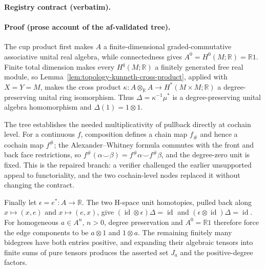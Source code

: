 \noindent\textbf{Registry contract (verbatim).}

\paragraph{Proof (prose account of the af-validated tree).}
The cup product first makes $A$ a finite-dimensional graded-commutative associative
unital real algebra, while connectedness gives $A^0=H^0(M;\mathbb R)=\mathbb R1$.
Finite total dimension makes every $H^q(M;\mathbb R)$ a finitely generated free real
module, so Lemma~\ref{lem:topology-kunneth-cross-product}, applied with $X=Y=M$, makes
the cross product $\kappa:A\otimes_{\mathbb R}A\to H^*(M\times M;\mathbb R)$ a
degree-preserving unital ring isomorphism.  Thus $\Delta=\kappa^{-1}\mu^*$ is a
degree-preserving unital algebra homomorphism and $\Delta(1)=1\otimes1$.

The tree establishes the needed multiplicativity of pullback directly at cochain level.
For a continuous $f$, composition defines a chain map $f_\#$ and hence a cochain map
$f^\#$; the Alexander--Whitney formula commutes with the front and back face restrictions,
so $f^\#(\alpha\smile\beta)=f^\#\alpha\smile f^\#\beta$, and the degree-zero unit is
fixed.  This is the repaired branch: a verifier challenged the earlier unsupported appeal
to functoriality, and the two cochain-level nodes replaced it without changing the contract.

Finally let $\epsilon=e^*:A\to\mathbb R$.  The two H-space unit homotopies, pulled back
along $x\mapsto(x,e)$ and $x\mapsto(e,x)$, give
$(\operatorname{id}\otimes\epsilon)\Delta=\operatorname{id}$ and
$(\epsilon\otimes\operatorname{id})\Delta=\operatorname{id}$.  For homogeneous
$a\in A^n$, $n>0$, degree preservation and $A^0=\mathbb R1$ therefore force the edge
components to be $a\otimes1$ and $1\otimes a$.  The remaining finitely many bidegrees
have both entries positive, and expanding their algebraic tensors into finite sums of pure
tensors produces the asserted set $J_a$ and the positive-degree factors.

